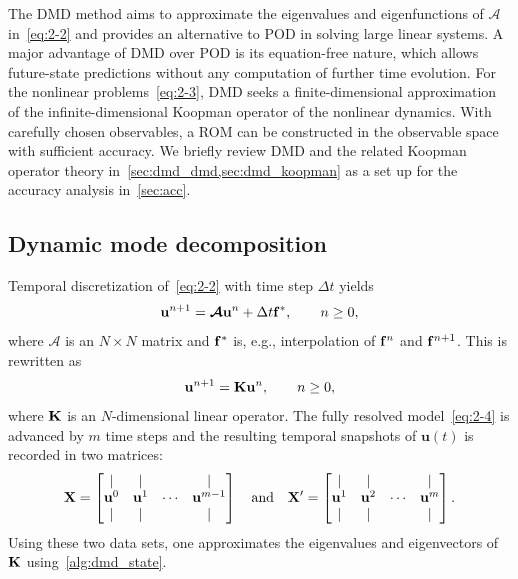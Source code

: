 \documentclass[10pt]{article}
\numberwithin{equation}{section}
\theoremstyle{plain}
\theoremstyle{remark}
\theoremstyle{remark}
\begin{document}
The DMD method aims to approximate the eigenvalues and eigenfunctions of $\mathcal A$ in~\cref{eq:2-2} and provides an alternative to POD in solving large linear systems. A major advantage of DMD over POD is its equation-free nature, which allows future-state predictions without any computation of further time evolution. For the nonlinear problems~\cref{eq:2-3}, DMD seeks a finite-dimensional approximation of the infinite-dimensional Koopman operator of the nonlinear dynamics. With carefully chosen observables, a ROM can be constructed in the observable space with sufficient accuracy. We briefly review DMD and the related Koopman operator theory in~\cref{sec:dmd_dmd,sec:dmd_koopman} as a set up for the accuracy analysis in~\cref{sec:acc}.

\subsection{Dynamic mode decomposition}
\label{sec:dmd_dmd}

Temporal discretization of~\cref{eq:2-2} with time step $\Delta t$ yields
\begin{equation}\label{eq:2-4}
\mathbf u^{n+1} = \boldsymbol{\mathcal A}\mathbf  u^n+\Delta t\bold f^*, \qquad n \ge 0,
\end{equation}
where $\boldsymbol{\mathcal A}$ is an $N\times N$ matrix and $\bold f^*$ is, e.g., interpolation of $\bold f^n$ and $\bold f^{n+1}$. This is rewritten as
\begin{equation}\label{eq:2-5}
\bold u^{n+1}  = \bold K \bold u^n, \qquad n \ge 0,
\end{equation}
where $\bold K$ is an $N$-dimensional linear operator. The fully resolved model~\cref{eq:2-4} is advanced by $m$ time steps  and the resulting temporal snapshots of $\mathbf u(t)$ is recorded in two matrices:%
%
\begin{equation}\label{eq:2-6}
\bold X = \begin{bmatrix}
|&|&&|\\
\bold u^0&\bold u^1&\cdots&\bold u^{m-1}\\
|&|&&|
\end{bmatrix} \quad\text{and}\quad \bold X' = \begin{bmatrix}
|&|&&|\\
\bold u^1&\bold u^2&\cdots&\bold u^{m}\\
|&|&&|
\end{bmatrix}.
\end{equation}
Using these two data sets, one approximates the eigenvalues and eigenvectors of $\bold K$ using~\cref{alg:dmd_state}.
\end{document}
